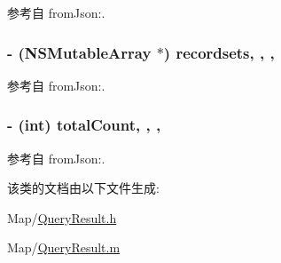 参考自 from\-Json\-:.

\hypertarget{interface_query_result_aafa1ccf4b6f17ccf7eb40a9065fc2331}{
\subsubsection[{recordsets}]{\setlength{\rightskip}{0pt plus 5cm}-\/ (N\-S\-Mutable\-Array $\ast$) recordsets\hspace{0.3cm}{\ttfamily [read]}, {\ttfamily [write]}, {\ttfamily [atomic]}, {\ttfamily [retain]}}}\label{interface_query_result_aafa1ccf4b6f17ccf7eb40a9065fc2331}


参考自 from\-Json\-:.

\hypertarget{interface_query_result_a8b261d4cb2e36b27791f064789c8644b}{
\subsubsection[{total\-Count}]{\setlength{\rightskip}{0pt plus 5cm}-\/ (int) total\-Count\hspace{0.3cm}{\ttfamily [read]}, {\ttfamily [write]}, {\ttfamily [atomic]}, {\ttfamily [assign]}}}\label{interface_query_result_a8b261d4cb2e36b27791f064789c8644b}


参考自 from\-Json\-:.



该类的文档由以下文件生成\-:\begin{DoxyCompactItemize}
\item 
Map/\hyperlink{_query_result_8h}{Query\-Result.\-h}\item 
Map/\hyperlink{_query_result_8m}{Query\-Result.\-m}\end{DoxyCompactItemize}
